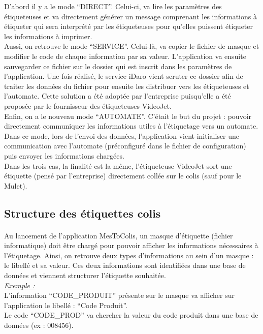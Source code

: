 \documentclass[a4paper,12pt]{extarticle}
\begin{document}
D’abord il y a le mode “DIRECT”. Celui-ci, va lire les paramètres des étiqueteuses et va directement générer un message comprenant les informations à étiqueter qui sera interprété par les étiqueteuses pour qu’elles puissent étiqueter les informations à imprimer.\\
Aussi, on retrouve le mode “SERVICE”. Celui-là, va copier le fichier de masque et modifier le code de chaque information par sa valeur. L’application va ensuite sauvegarder ce fichier sur le dossier qui est inscrit dans les paramètres de l’application. Une fois réalisé, le service iDaro vient scruter ce dossier afin de traiter les données du fichier pour ensuite les distribuer vers les étiqueteuses et l'automate. Cette solution a été adoptée par l’entreprise puisqu’elle a été proposée par le fournisseur des étiqueteuses VideoJet.\\
Enfin, on a le nouveau mode “AUTOMATE”. C’était le but du projet : pouvoir directement communiquer les informations utiles à l’étiquetage vers un automate. Dans ce mode, lors de l’envoi des données, l’application vient initialiser une communication avec l’automate (préconfiguré dans le fichier de configuration) puis envoyer les informations chargées.\\
Dans les trois cas, la finalité est la même, l’étiqueteuse VideoJet sort une étiquette (pensé par l’entreprise) directement collée sur le colis (sauf pour le Mulet).

	\subsection{Structure des étiquettes colis}
		\paragraph{}

	Au lancement de l’application MesToColis, un masque d’étiquette (fichier informatique) doit être chargé pour pouvoir afficher les informations nécessaires à l’étiquetage. Ainsi, on retrouve deux types d’informations au sein d’un masque : le libellé et sa valeur. Ces deux informations sont identifiées dans une base de données et viennent structurer l’étiquette souhaitée.\\

\emph{\underline{Exemple :}}\\
	L'information “CODE\_PRODUIT” présente sur le masque va afficher sur l’application le libellé : “Code Produit”.\\
	Le code “CODE\_PROD” va chercher la valeur du code produit dans une base de données (ex : 008456).\\
\end{document}
